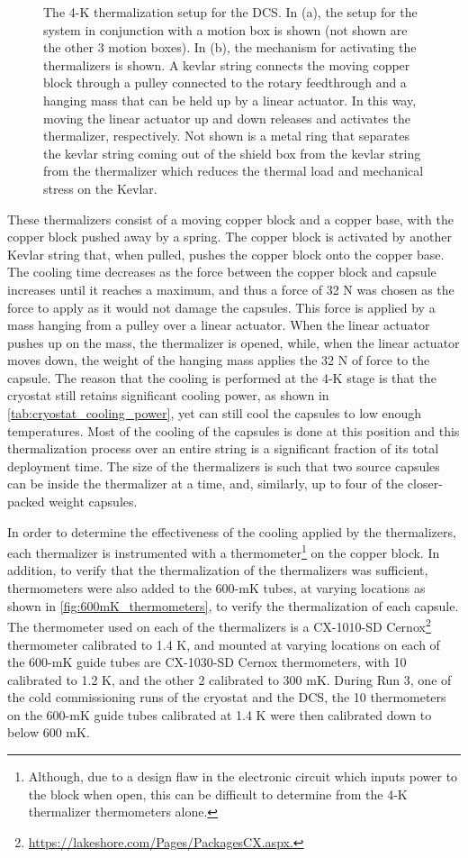 \begin{figure}[htbp]
\caption[The 4-K thermalization setup for the DCS.]
{The 4-K thermalization setup for the DCS.
In (a), the setup for the system in conjunction with a motion box is shown (not shown are the other 3 motion boxes).
In (b), the mechanism for activating the thermalizers is shown.
A kevlar string connects the moving copper block through a pulley connected to the rotary feedthrough and a hanging mass that can be held up by a linear actuator.
In this way, moving the linear actuator up and down releases and activates the thermalizer, respectively.
Not shown is a metal ring that separates the kevlar string coming out of the shield box from the kevlar string from the thermalizer which reduces the thermal load and mechanical stress on the Kevlar.}
\label{fig:DCS_4K_schematic}
\end{figure}

These thermalizers consist of a moving copper block and a copper base, with the copper block pushed away by a spring.
The copper block is activated by another Kevlar string that, when pulled, pushes the copper block onto the copper base.
The cooling time decreases as the force between the copper block and capsule increases until it reaches a maximum, and thus a force of 32 N was chosen as the force to apply as it would not damage the capsules.
This force is applied by a mass hanging from a pulley over a linear actuator. When the linear actuator pushes up on the mass, the thermalizer is opened, while, when the linear actuator moves down, the weight of the hanging mass applies the 32 N of force to the capsule.
The reason that the cooling is performed at the 4-K stage is that the cryostat still retains significant cooling power, as shown in \autoref{tab:cryostat_cooling_power}, yet can still cool the capsules to low enough temperatures.
Most of the cooling of the capsules is done at this position and this thermalization process over an entire string is a significant fraction of its total deployment time.
The size of the thermalizers is such that two source capsules can be inside the thermalizer at a time, and, similarly, up to four of the closer-packed weight capsules.

In order to determine the effectiveness of the cooling applied by the thermalizers, each thermalizer is instrumented with a thermometer\footnote{Although, due to a design flaw in the electronic circuit which inputs power to the block when open, this can be difficult to determine from the 4-K thermalizer thermometers alone.} on the copper block.
In addition, to verify that the thermalization of the thermalizers was sufficient, thermometers were also added to the 600-mK tubes, at varying locations as shown in \autoref{fig:600mK_thermometers}, to verify the thermalization of each capsule.
The thermometer used on each of the thermalizers is a CX-1010-SD Cernox\footnote{\RaggedRight\url{https://lakeshore.com/Pages/PackagesCX.aspx.}} thermometer calibrated to 1.4 K, and mounted at varying locations on each of the 600-mK guide tubes are CX-1030-SD Cernox thermometers, with 10 calibrated to 1.2 K, and the other 2 calibrated to 300 mK.
During Run 3, one of the cold commissioning runs of the cryostat and the DCS, the 10 thermometers on the 600-mK guide tubes calibrated at 1.4 K were then calibrated down to below 600 mK.

